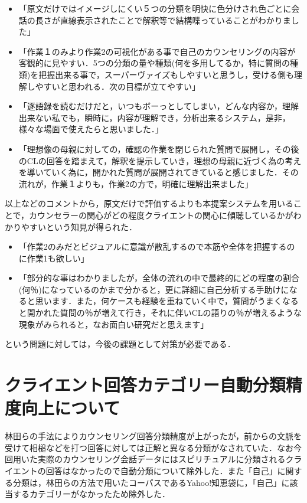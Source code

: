 \documentclass[shuuron]{kuee}
\begin{document}
%
\begin{itemize}
\item 「原文だけではイメージしにくい５つの分類を明快に色分けされ色ごとに会話の長さが直線表示されたことで解釈等で結構喋っていることがわかりました」
\item 「作業１のみより作業2の可視化がある事で自己のカウンセリングの内容が客観的に見やすい．5つの分類の量や種類(何を多用してるか，特に質問の種類)を把握出来る事で，スーパーヴァイズもしやすいと思うし，受ける側も理解しやすいと思われる．次の目標が立てやすい」
\item 「逐語録を読むだけだと，いつもボーっとしてしまい，どんな内容か，理解出来ない私でも，瞬時に，内容が理解でき，分析出来るシステム，是非，様々な場面で使えたらと思いました．」
\item 「理想像の母親に対しての，確認の作業を閉じられた質問で展開し，その後のCLの回答を踏まえて，解釈を提示していき，理想の母親に近づく為の考えを導いていく為に，開かれた質問が展開されてきていると感じました．その流れが，作業１よりも，作業2の方で，明確に理解出来ました」
\end{itemize}
以上などのコメントから，原文だけで評価するよりも本提案システムを用いることで，カウンセラーの関心がどの程度クライエントの関心に傾聴しているかがわかりやすいという知見が得られた．

\begin{itemize}
\item 「作業2のみだとビジュアルに意識が散乱するので本筋や全体を把握するのに作業1も欲しい」
\item 「部分的な事はわかりましたが，全体の流れの中で最終的にどの程度の割合(何％)になっているのかまで分かると，更に詳細に自己分析する手助けになると思います．また，何ケースも経験を重ねていく中で，質問がうまくなると開かれた質問の％が増えて行き，それに伴いCLの語りの％が増えるような現象がみられると，なお面白い研究だと思えます」
\end{itemize}
という問題に対しては，今後の課題として対策が必要である．


\section{クライエント回答カテゴリー自動分類精度向上について}%


林田ら\cite{hayashidaEn}の手法によりカウンセリング回答分類精度が上がったが，前からの文脈を受けて相槌などを打つ回答に対しては正解と異なる分類がなされていた．なお今回用いた実際のカウンセリング会話データにはスピリチュアルに分類されるクライエントの回答はなかったので自動分類について除外した．また「自己」に関する分類は，林田らの方法で用いたコーパスであるYahoo!知恵袋に，「自己」に該当するカテゴリーがなかったため除外した．
\end{document}
